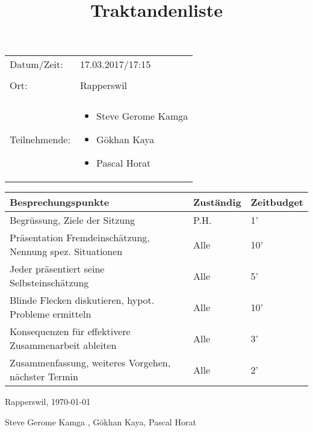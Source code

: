 \documentclass[10pt]{article}
\title{Traktandenliste}
\date{}             %
\begin{document}
\begin{landscape}
\maketitle




\begin{tabular}{l p{5cm}}


Datum/Zeit: & 17.03.2017/17:15 \\ \\

Ort: & Rapperswil \\ \\
Teilnehmende: & \begin{itemize} \item Steve Gerome Kamga\item Gökhan Kaya \item Pascal Horat \end{itemize}

\end{tabular}

\vspace{1cm}

\begin{tabular}{|l|l|l|}
\hline
\textbf{Besprechungspunkte} & \textbf{Zuständig} & \textbf{Zeitbudget} \\ \hline
Begrüssung, Ziele der Sitzung& P.H. & 1' \\ \hline
Präsentation Fremdeinschätzung, Nennung spez. Situationen & Alle & 10' \\ \hline
Jeder präsentiert seine Selbsteinschätzung & Alle & 5' \\ \hline
Blinde Flecken diskutieren, hypot. Probleme ermitteln  & Alle & 10' \\ \hline
Konsequenzen für effektivere Zusammenarbeit ableiten & Alle & 3' \\ \hline
Zusammenfassung, weiteres Vorgehen, nächster Termin & Alle & 2' \\ \hline

\end{tabular}

\vspace{1cm}

Rapperswil, \today

\vspace{1cm}

Steve Gerome Kamga , Gökhan Kaya, Pascal Horat
\end{landscape}
\end{document}
